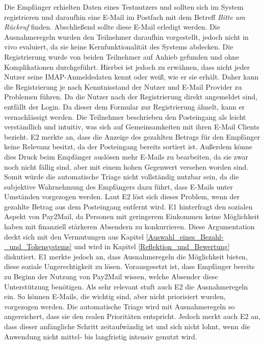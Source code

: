 Die Empfänger erhielten Daten eines Testnutzers und sollten sich im System registrieren und daraufhin eine E-Mail im Postfach mit dem Betreff \textit{Bitte um Rückruf} finden. Abschließend sollte diese E-Mail erledigt werden. Die Ausnahmeregeln wurden den Teilnehmer daraufhin vorgestellt, jedoch nicht in vivo evaluiert, da sie keine Kernfunktionalität des Systems abdecken. Die Registrierung wurde von beiden Teilnehmer auf Anhieb gefunden und ohne Komplikationen durchgeführt. Hierbei ist jedoch zu erwähnen, dass nicht jeder Nutzer seine IMAP-Anmeldedaten kennt oder weiß, wie er sie erhält. Daher kann die Registrierung je nach Kenntnisstand der Nutzer und E-Mail Provider zu Problemen führen. Da die Nutzer nach der Registrierung direkt angemeldet sind, entfällt der Login. Da dieser dem Formular zur Registrierung ähnelt, kann er vernachlässigt werden. Die Teilnehmer beschrieben den Posteingang als leicht verständlich und intuitiv, was sich auf Gemeinsamkeiten mit ihren E-Mail Clients bezieht. E2 merkte an, dass die Anzeige des gezahlten Betrags für den Empfänger keine Relevanz besitzt, da der Posteingang bereits sortiert ist. Außerdem könne dies Druck beim Empfänger auslösen mehr E-Mails zu bearbeiten, da sie zwar noch nicht fällig sind, aber mit einem hohen Gegenwert versehen worden sind. Somit würde die automatische Triage nicht vollständig nutzbar sein, da die subjektive Wahrnehmung des Empfängers dazu führt, dass E-Mails unter Umständen vorgezogen werden. Laut E2 löst sich dieses Problem, wenn der gezahlte Betrag aus dem Posteingang entfernt wird. E1 hinterfragt den sozialen Aspekt von Pay2Mail, da Personen mit geringerem Einkommen keine Möglichkeit haben mit finanziell stärkeren Absendern zu konkurrieren. Diese Argumentation deckt sich mit den Vermutungen aus Kapitel \ref{Auswahl_eines_Bezahl-_und_Tokensystems} und wird in Kapitel \ref{Reflektion_und_Bewertung} diskutiert. E1 merkte jedoch an, dass Ausnahmeregeln die Möglichkeit bieten, diese soziale Ungerechtigkeit zu lösen. Vorausgesetzt ist, dass Empfänger bereits zu Beginn der Nutzung von Pay2Mail wissen, welche Absender diese Unterstützung benötigen. Als sehr relevant stuft auch E2 die Ausnahmeregeln ein. So können E-Mails, die wichtig sind, aber nicht priorisiert wurden, vorgezogen werden. Die automatische Triage wird mit Ausnahmeregeln so angereichert, dass sie den realen Prioritäten entspricht. Jedoch merkt auch E2 an, dass dieser anfängliche Schritt zeitaufwändig ist und sich nicht lohnt, wenn die Anwendung nicht mittel- bis langfristig intensiv genutzt wird.  

